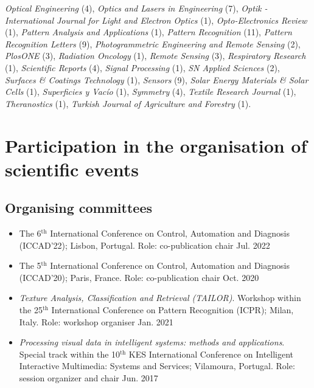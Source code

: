 \documentclass[11pt]{article}
\begin{document}
\begin{itemize}
    \emph{Optical Engineering} (4),
    \emph{Optics and Lasers in Engineering} (7),
    \emph{Optik - International Journal for Light and Electron Optics} (1),
    \emph{Opto-Electronics Review} (1),
    \emph{Pattern Analysis and Applications} (1),
    \emph{Pattern Recognition} (11),
    \emph{Pattern Recognition Letters} (9),
    \emph{Photogrammetric Engineering and Remote Sensing} (2),
    \emph{PlosONE} (3),
    \emph{Radiation Oncology} (1),
    \emph{Remote Sensing} (3),
    \emph{Respiratory Research} (1),
    \emph{Scientific Reports} (4),
    \emph{Signal Processing} (1),
    \emph{SN Applied Sciences} (2),
    \emph{Surfaces \& Coatings Technology} (1),
    \emph{Sensors} (9),
    \emph{Solar Energy Materials \& Solar Cells} (1),
    \emph{Superficies y Vacío} (1),
    \emph{Symmetry} (4),
    \emph{Textile Research Journal} (1),
    \emph{Theranostics} (1),
    \emph{Turkish Journal of Agriculture and Forestry} (1).
\end{itemize}

\section*{Participation in the organisation of scientific events}

\subsection*{Organising committees}

\begin{itemize} 

	\item The 6$^\text{th}$ International Conference on Control, Automation and Diagnosis (ICCAD'22); Lisbon, Portugal. Role: co-publication chair \hfill Jul. 2022

	\item The 5$^\text{th}$ International Conference on Control, Automation and Diagnosis (ICCAD'20); Paris, France. Role: co-publication chair \hfill Oct. 2020 

	\item \emph{Texture Analysis, Classification and Retrieval (TAILOR)}. Workshop within the 25$^\text{th}$ International Conference on Pattern Recognition (ICPR); Milan, Italy. Role: workshop organiser \hfill Jan. 2021

	\item \emph{Processing visual data in intelligent systems: methods and applications}. Special track within the 10$^\text{th}$ KES International Conference on Intelligent Interactive Multimedia: Systems and Services; Vilamoura, Portugal. Role: session organizer and chair \hfill Jun. 2017

\end{itemize}	
\end{document}
